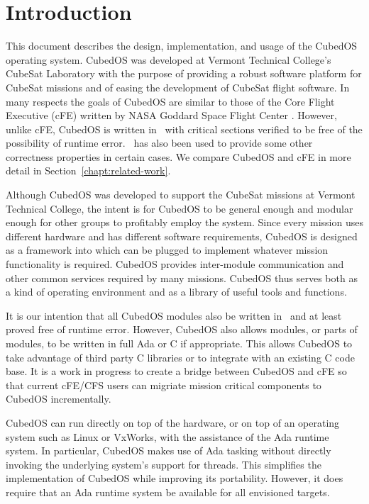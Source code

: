 \chapter{Introduction}
\label{chapt:introduction}

This document describes the design, implementation, and usage of the CubedOS operating system.
CubedOS was developed at Vermont Technical College's CubeSat Laboratory with the purpose of
providing a robust software platform for CubeSat missions and of easing the development of
CubeSat flight software. In many respects the goals of CubedOS are similar to those of the Core
Flight Executive (cFE) written by NASA Goddard Space Flight Center \cite{cFE}. However, unlike
cFE, CubedOS is written in \SPARK\ with critical sections verified to be free of the possibility
of runtime error. \SPARK\ has also been used to provide some other correctness properties in
certain cases. We compare CubedOS and cFE in more detail in Section~\ref{chapt:related-work}.

Although CubedOS was developed to support the CubeSat missions at Vermont Technical College, the
intent is for CubedOS to be general enough and modular enough for other groups to profitably
employ the system. Since every mission uses different hardware and has different software
requirements, CubedOS is designed as a framework into which  can be plugged to
implement whatever mission functionality is required. CubedOS provides inter-module
communication and other common services required by many missions. CubedOS thus serves both as a
kind of operating environment and as a library of useful tools and functions.

It is our intention that all CubedOS modules also be written in \SPARK\ and at least proved free
of runtime error. However, CubedOS also allows modules, or parts of modules, to be written in
full Ada or C if appropriate. This allows CubedOS to take advantage of third party C libraries
or to integrate with an existing C code base. It is a work in progress to create a bridge
between CubedOS and cFE so that current cFE/CFS users can migriate mission critical components
to CubedOS incrementally.

CubedOS can run directly on top of the hardware, or on top of an operating system such as Linux
or VxWorks, with the assistance of the Ada runtime system. In particular, CubedOS makes use of
Ada tasking without directly invoking the underlying system's support for threads. This
simplifies the implementation of CubedOS while improving its portability. However, it does
require that an Ada runtime system be available for all envisioned targets.

